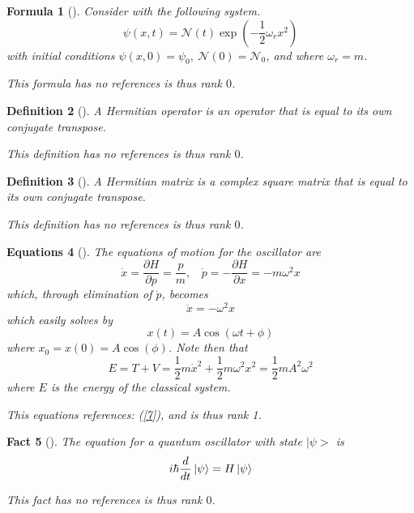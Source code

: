 \documentclass{article}
\newtheorem{definition}{Definition}
\newtheorem{fact}[definition]{Fact}
\newtheorem{formula}[definition]{Formula}
\newtheorem{equations}[definition]{Equations}
\begin{document}
\begin{tcolorbox}\begin{formula}[]\label{10}Consider with the following system. 
 $$\psi(x,t)=\mathcal{N}(t)\exp\left(-\frac{1}{2}\omega_r x^2\right)$$
 with initial conditions $\psi(x,0)=\psi_0,~\mathcal{N}(0)=\mathcal{N}_0$, 
 and where $\omega_r=m$.
 
 This formula has no references is thus rank $0$.\end{formula}\end{tcolorbox}
\begin{tcolorbox}\begin{definition}[]\label{11}A Hermitian operator is an operator that is equal 
 to its own conjugate transpose.
 
 This definition has no references is thus rank $0$.\end{definition}\end{tcolorbox}
\begin{tcolorbox}\begin{definition}[]\label{12}A Hermitian matrix is a complex square 
 matrix that is equal to its own conjugate transpose.
 
 This definition has no references is thus rank $0$.\end{definition}\end{tcolorbox}
\begin{tcolorbox}\begin{equations}[]\label{13}The equations of motion for the oscillator are $$\dot{x}=
 \frac{\partial H}{\partial p}=\frac{p}{m},~~~~\dot{p}=-\frac{\partial H}{\partial x}=
 -m\omega^2 x$$ which, through elimination of $\dot{p}$, becomes
 $$\ddot{x}=-\omega^2x$$ which easily solves by
 $$x(t)=A\cos(\omega t+\phi)$$ where $x_0=x(0)=A\cos(\phi)$. Note then that
 $$E=T+V=\frac{1}{2}m\dot{x}^2+\frac{1}{2}m\omega^2x^2=\frac{1}{2}mA^2\omega^2$$
 where $E$ is the energy of the classical system.
 
 This equations references: (\ref{7}), and is thus rank 1.\end{equations}\end{tcolorbox}
\begin{tcolorbox}\begin{fact}[]\label{14}The equation for a quantum oscillator with state $|\psi>$ is
 $$i\hbar\frac{d}{dt}\ket{\psi}=H\ket{\psi}$$
 
 This fact has no references is thus rank $0$.\end{fact}\end{tcolorbox}
\end{document}
